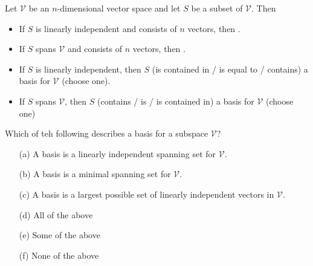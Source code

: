 \begin{thm}
    Let $\mathcal{V}$ be an $n$-dimensional vector space and let $S$ be a subset of
    $\mathcal{V}$.  Then
    \begin{itemize}
        \item If $S$ is linearly independent and consists of $n$ vectors, then
            \underline{\hspace{1in}}.
        \item If $S$ spans $\mathcal{V}$ and consists of $n$ vectors, then
            \underline{\hspace{1in}}.
        \item If $S$ is linearly independent, then $S$ (is contained in / is equal to /
            contains) a basis for $\mathcal{V}$ (choose one). 
        \item If $S$ spans $\mathcal{V}$, then $S$ (contains / is / is contained in) a
            basis for $\mathcal{V}$ (choose one)
    \end{itemize}
\end{thm}


\begin{problem}
    Which of teh following describes a basis for a subspace $\mathcal{V}$?
    \begin{enumerate}
        \item[(a)] A basis is a linearly independent spanning set for $\mathcal{V}$.
        \item[(b)] A basis is a minimal spanning set for $\mathcal{V}$.
        \item[(c)] A basis is a largest possible set of linearly independent vectors in
            $\mathcal{V}$.
        \item[(d)] All of the above
        \item[(e)] Some of the above
        \item[(f)] None of the above
    \end{enumerate}
\end{problem}


